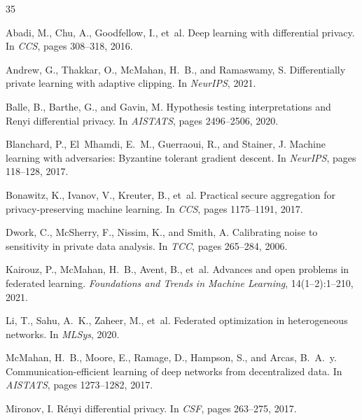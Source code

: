 \documentclass[11pt,a4paper]{article}
\begin{document}
\begin{thebibliography}{35}

Abadi, M., Chu, A., Goodfellow, I., et~al.
\newblock Deep learning with differential privacy.
\newblock In \emph{CCS}, pages 308--318, 2016.

Andrew, G., Thakkar, O., McMahan, H.~B., and Ramaswamy, S.
\newblock Differentially private learning with adaptive clipping.
\newblock In \emph{NeurIPS}, 2021.

Balle, B., Barthe, G., and Gavin, M.
\newblock Hypothesis testing interpretations and Renyi differential privacy.
\newblock In \emph{AISTATS}, pages 2496--2506, 2020.

Blanchard, P., El~Mhamdi, E.~M., Guerraoui, R., and Stainer, J.
\newblock Machine learning with adversaries: Byzantine tolerant gradient descent.
\newblock In \emph{NeurIPS}, pages 118--128, 2017.

Bonawitz, K., Ivanov, V., Kreuter, B., et~al.
\newblock Practical secure aggregation for privacy-preserving machine learning.
\newblock In \emph{CCS}, pages 1175--1191, 2017.

Dwork, C., McSherry, F., Nissim, K., and Smith, A.
\newblock Calibrating noise to sensitivity in private data analysis.
\newblock In \emph{TCC}, pages 265--284, 2006.

Kairouz, P., McMahan, H.~B., Avent, B., et~al.
\newblock Advances and open problems in federated learning.
\newblock \emph{Foundations and Trends in Machine Learning}, 14(1--2):1--210, 2021.

Li, T., Sahu, A.~K., Zaheer, M., et~al.
\newblock Federated optimization in heterogeneous networks.
\newblock In \emph{MLSys}, 2020.

McMahan, H.~B., Moore, E., Ramage, D., Hampson, S., and {Arcas}, B.~A.~y.
\newblock Communication-efficient learning of deep networks from decentralized data.
\newblock In \emph{AISTATS}, pages 1273--1282, 2017.

Mironov, I.
\newblock R\'enyi differential privacy.
\newblock In \emph{CSF}, pages 263--275, 2017.


\end{thebibliography}
\end{document}
